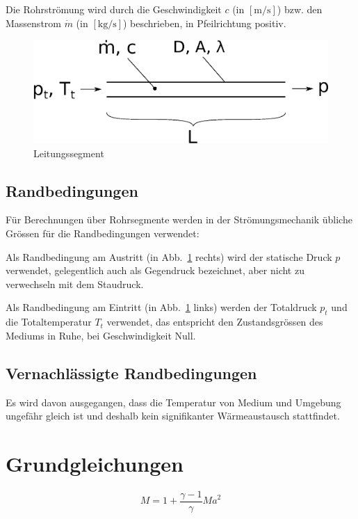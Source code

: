 \documentclass[a4paper,10pt,twocolumn]{article}
\begin{document}
Die Rohrströmung wird durch die Geschwindigkeit $c$ (in $\mathrm{[m/s]}$) bzw. den Massenstrom $\dot m$ (in $\mathrm{[kg/s]}$) beschrieben, in Pfeilrichtung positiv.

\begin{figure}[hbp]
\centering
\includegraphics[width=0.9\hsize]{problem.eps}
\caption{Leitungssegment}
\label{fig:leitungssegment}
\end{figure}

\subsection{Randbedingungen}

Für Berechnungen über Rohrsegmente werden in der Strömungsmechanik übliche Grössen für die Randbedingungen verwendet:

Als Randbedingung am Austritt (in Abb.~\ref{fig:leitungssegment} rechts) wird der statische Druck $p$ verwendet, gelegentlich auch als Gegendruck bezeichnet, aber nicht zu verwechseln mit dem Staudruck.

Als Randbedingung am Eintritt (in Abb.~\ref{fig:leitungssegment} links) werden der Totaldruck $p_t$ und die Totaltemperatur $T_t$ verwendet, das entspricht den Zustandsgrössen des Mediums in Ruhe, bei Geschwindigkeit Null.

\subsection{Vernachlässigte Randbedingungen}

Es wird davon ausgegangen, dass die Temperatur von Medium und Umgebung ungefähr gleich ist und deshalb kein signifikanter Wärmeaustausch stattfindet.


\section{Grundgleichungen}

\begin{equation}
M = 1 + \frac{\gamma-1}{\gamma} \mathit{Ma}^2
\end{equation}
\end{document}
